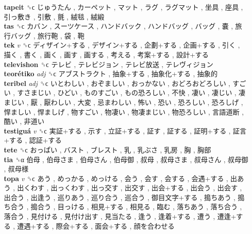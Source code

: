 \textbf{tapeit} ␝ϲ   じゅうたん ,  カーペット ,  マット ,  ラグ ,  ラグマット ,  坐具 ,  座具 ,  引っ敷き ,  引敷 ,  氈 ,  絨毯 ,  絨緞   \\
\textbf{tas} ␝ϲ   カバン ,  スーツケース ,  ハンドバック ,  ハンドバッグ ,  バッグ ,  嚢 ,  旅行バッグ ,  旅行鞄 ,  袋 ,  鞄   \\
\textbf{tek} \emph{v}  ␝ϲ   ディザイン+する ,  デザイン+する ,  企劃+する ,  企画+する ,  引く ,  描く ,  書く ,  画く ,  画す ,  画する ,  考える ,  考案+する ,  設計+する   \\
\textbf{televishon} ␝ϲ   テレビ ,  テレビジョン ,  テレビ放送 ,  テレヴィジョン   \\
\textbf{teorétiko} \emph{adj}  ␝ϲ   アブストラクト ,  抽象+する ,  抽象化+する ,  抽象的   \\
\textbf{teribel} \emph{adj}  ␝ϲ   いとわしい ,  おぞましい ,  おっかない ,  おどろおどろしい ,  すごい ,  すさまじい ,  ひどい ,  ものすごい ,  もの恐ろしい ,  不快 ,  凄い ,  凄じい ,  凄まじい ,  厭 ,  厭わしい ,  大変 ,  忌まわしい ,  怖い ,  恐い ,  恐ろしい ,  恐ろしげ ,  悍ましい ,  悍ましげ ,  物すごい ,  物凄い ,  物凄まじい ,  物恐ろしい ,  言語道断 ,  酷い ,  非道い   \\
\textbf{testiguá} \emph{v}  ␝ϲ   実証+する ,  示す ,  立証+する ,  証す ,  証する ,  証明+する ,  証言+する ,  認証+する   \\
\textbf{tete} ␝ϲ   おっぱい ,  バスト ,  ブレスト ,  乳 ,  乳ぶさ ,  乳房 ,  胸 ,  胸部   \\
\textbf{tia} ␝α   伯母 ,  伯母さま ,  伯母さん ,  伯母御 ,  叔母 ,  叔母さま ,  叔母さん ,  叔母御 ,  叔母様   \\
\textbf{topa} \emph{v}  ␝ϲ   あう ,  めっかる ,  めっける ,  会う ,  会す ,  会する ,  会遇+する ,  出あう ,  出くわす ,  出っくわす ,  出っ交す ,  出交す ,  出会+する ,  出会う ,  出会す ,  出合う ,  出逢う ,  巡りあう ,  巡り合う ,  巡合う ,  御目文字+する ,  搗ちあう ,  搗ち合う ,  搗合う ,  目っける ,  相見+する ,  相見る ,  臨む ,  落ちあう ,  落ち合う ,  落合う ,  見付ける ,  見付け出す ,  見当たる ,  逢う ,  逢着+する ,  遭う ,  遭逢+する ,  遭遇+する ,  際会+する ,  面会+する ,  顔を合わせる   \\
